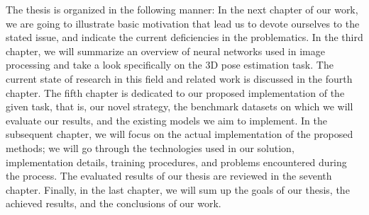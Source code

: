 \vspace{5mm}
\noindent The thesis is organized in the following manner: In the next chapter of our work, we are going to illustrate basic motivation that lead us to devote ourselves to the stated issue, and indicate the current deficiencies in the problematics. In the third chapter, we will summarize an overview of neural networks used in image processing and take a look specifically on the 3D pose estimation task. The current state of research in this field and related work is discussed in the fourth chapter. The fifth chapter is dedicated to our proposed implementation of the given task, that is, our novel strategy, the benchmark datasets on which we will evaluate our results, and the existing models we aim to implement. In the subsequent chapter, we will focus on the actual implementation of the proposed methods; we will go through the technologies used in our solution, implementation details, training procedures, and problems encountered during the process. The evaluated results of our thesis are reviewed in the seventh chapter. Finally, in the last chapter, we will sum up the goals of our thesis, the achieved results, and the conclusions of our work.
